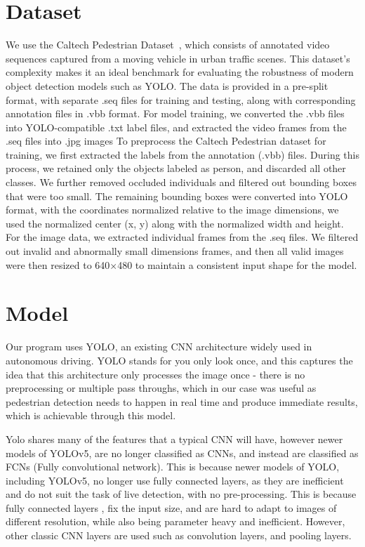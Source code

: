 \documentclass[11pt]{article}
\begin{document}
\section{Dataset}
We use the Caltech Pedestrian Dataset~\cite{caltechpedestrian}, which consists of annotated video sequences captured from a moving vehicle in urban traffic scenes. This dataset’s complexity makes it an ideal benchmark for evaluating the robustness of modern object detection models such as YOLO. The data is provided in a pre-split format, with separate .seq files for training and testing, along with corresponding annotation files in .vbb format. For model training, we converted the .vbb files into YOLO-compatible .txt label files, and extracted the video frames from the .seq files into .jpg images
To preprocess the Caltech Pedestrian dataset for training, we first extracted the labels from the annotation (.vbb) files. During this process, we retained only the objects labeled as person, and discarded all other classes. We further removed occluded individuals and filtered out bounding boxes that were too small. The remaining bounding boxes were converted into YOLO format, with the coordinates normalized relative to the image dimensions, we used the normalized center (x, y) along with the normalized width and height.
For the image data, we extracted individual frames from the .seq files. We filtered out invalid and abnormally small dimensions frames,  and then all valid images were then resized to 640×480 to maintain a consistent input shape for the model.
\section{Model}
Our program uses YOLO, an existing CNN architecture widely used in autonomous driving. YOLO stands for you only look once, and this captures the idea that this architecture only processes the image once - there is no preprocessing or multiple pass throughs, which in our case was useful as pedestrian detection needs to happen in real time and produce immediate results, which is achievable through this model. 

Yolo shares many of the features that a typical CNN will have, however newer models of YOLOv5, are no longer classified as CNNs, and instead are classified as FCNs (Fully convolutional network). This is because newer models of YOLO, including YOLOv5, no longer use fully connected layers, as they are inefficient and do not suit the task of live detection, with no pre-processing. This is because fully connected layers , fix the input size, and are hard to adapt to images of different resolution, while also being parameter heavy and inefficient. However, other classic CNN layers are used such as convolution layers, and pooling layers. 
\end{document}
